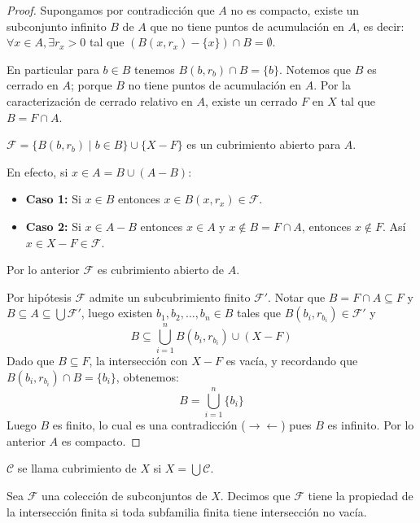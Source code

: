 \begin{proof}
    Supongamos por contradicción que $A$ no es compacto, existe un subconjunto infinito $B$ de $A$ que no tiene puntos de acumulación en $A$, es decir: $\forall x \in A, \exists r_x > 0$ tal que $(B(x, r_x) - \{x\}) \cap B = \emptyset$.
    
    En particular para $b \in B$ tenemos $B(b, r_b) \cap B = \{b\}$. Notemos que $B$ es cerrado en $A$; porque $B$ no tiene puntos de acumulación en $A$. Por la caracterización de cerrado relativo en $A$, existe un cerrado $F$ en $X$ tal que $B = F \cap A$.

    \begin{afirmacion}
        $\mathcal{F} = \{ B(b, r_b) \mid b \in B \} \cup \{ X - F \}$ es un cubrimiento abierto para $A$.
    \end{afirmacion}
    
    \begin{prueba}
    En efecto, si $x \in A = B \cup (A - B)$:
    \begin{itemize}
        \item \textbf{Caso 1:} Si $x \in B$ entonces $x \in B(x, r_x) \in \mathcal{F}$.
        \item \textbf{Caso 2:} Si $x \in A - B$ entonces $x \in A$ y $x \notin B = F \cap A$, entonces $x \notin F$. Así $x \in X - F \in \mathcal{F}$.
    \end{itemize}
    Por lo anterior $\mathcal{F}$ es cubrimiento abierto de $A$.
    \end{prueba}
    
    Por hipótesis $\mathcal{F}$ admite un subcubrimiento finito $\mathcal{F}'$. Notar que $B = F \cap A \subseteq F$ y $B \subseteq A \subseteq \bigcup \mathcal{F}'$, luego existen $b_1, b_2, \dots, b_n \in B$ tales que $B(b_i, r_{b_i}) \in \mathcal{F}'$ y
    \[B \subseteq \bigcup_{i=1}^n B(b_i, r_{b_i}) \cup (X - F)\]
    Dado que $B \subseteq F$, la intersección con $X-F$ es vacía, y recordando que $B(b_i, r_{b_i}) \cap B = \{b_i\}$, obtenemos:
    \[B = \bigcup_{i=1}^n \{b_i\}\]
    Luego $B$ es finito, lo cual es una contradicción ($\rightarrow\leftarrow$) pues $B$ es infinito. Por lo anterior $A$ es compacto.
\end{proof}

\vspace{0.5cm}
\begin{definicion}[Cubrimiento]
    $\mathcal{C}$ se llama cubrimiento de $X$ si $X = \bigcup \mathcal{C}$.
\end{definicion}

\begin{definicion}
    Sea $\mathcal{F}$ una colección de subconjuntos de $X$. Decimos que $\mathcal{F}$ tiene la propiedad de la intersección finita si toda subfamilia finita tiene intersección no vacía.
\end{definicion}

